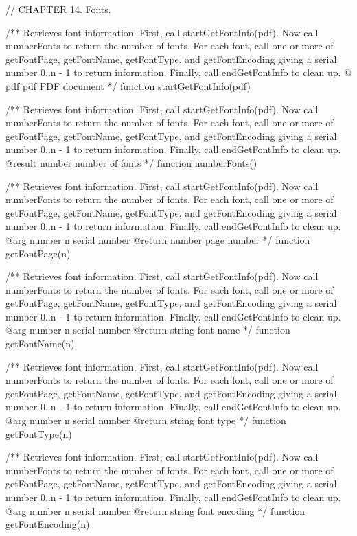// CHAPTER 14. Fonts.

/** Retrieves font information. First, call startGetFontInfo(pdf). Now call
numberFonts to return the number of fonts. For each font, call one or more of
getFontPage, getFontName, getFontType, and getFontEncoding giving a serial
number 0..n - 1 to return information. Finally, call endGetFontInfo to clean
up.
@ {pdf} pdf PDF document */
function startGetFontInfo(pdf) {}

/** Retrieves font information. First, call startGetFontInfo(pdf). Now call
numberFonts to return the number of fonts. For each font, call one or more of
getFontPage, getFontName, getFontType, and getFontEncoding giving a serial
number 0..n - 1 to return information. Finally, call endGetFontInfo to clean
up.
@result {number} number of fonts */
function numberFonts() {}

/** Retrieves font information. First, call startGetFontInfo(pdf). Now call
numberFonts to return the number of fonts. For each font, call one or more of
getFontPage, getFontName, getFontType, and getFontEncoding giving a serial
number 0..n - 1 to return information. Finally, call endGetFontInfo to clean
up.
@arg {number} n serial number
@return {number} page number */
function getFontPage(n) {}

/** Retrieves font information. First, call startGetFontInfo(pdf). Now call
numberFonts to return the number of fonts. For each font, call one or more of
getFontPage, getFontName, getFontType, and getFontEncoding giving a serial
number 0..n - 1 to return information. Finally, call endGetFontInfo to clean
up.
@arg {number} n serial number
@return {string} font name */
function getFontName(n) {}

/** Retrieves font information. First, call startGetFontInfo(pdf). Now call
numberFonts to return the number of fonts. For each font, call one or more of
getFontPage, getFontName, getFontType, and getFontEncoding giving a serial
number 0..n - 1 to return information. Finally, call endGetFontInfo to clean
up.
@arg {number} n serial number
@return {string} font type */
function getFontType(n) {}

/** Retrieves font information. First, call startGetFontInfo(pdf). Now call
numberFonts to return the number of fonts. For each font, call one or more of
getFontPage, getFontName, getFontType, and getFontEncoding giving a serial
number 0..n - 1 to return information. Finally, call endGetFontInfo to clean
up.
@arg {number} n serial number
@return {string} font encoding */
function getFontEncoding(n) {}

